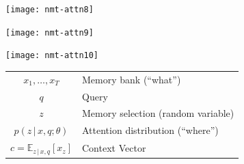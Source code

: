 \documentclass{beamer}
\newcommand{\air}{\vspace{0.25cm}}
\newcommand{\given}{\,|\,}
\begin{document}
\begin{frame}
  \begin{center}
  \end{center}
\center
\vspace{-5mm}
 \air
\texttt{[image: nmt-attn8]}
\end{frame}
\begin{frame}
  \begin{center}
  \end{center}
\center
\vspace{-5mm}
 \air
\texttt{[image: nmt-attn9]}
\end{frame}
\begin{frame}
  \begin{center}
  \end{center}
\center
\vspace{-5mm}
 \air
\texttt{[image: nmt-attn10]}
\end{frame}


\begin{frame}
  \begin{center}

    \air 
    \air 

  \begin{tabular}{cl}
    $x_1, \ldots, x_T $ & Memory bank (``what'') \\
    $q$ &Query \\
    $z$ &Memory selection (random variable)  \\ 
    $p(z \given x, q; \theta)$ & Attention distribution (``where'') \\ 
    $c  =\mathbb{E}_{z \given x, q } [x_z]  $ & Context Vector \\
  \end{tabular}
  \end{center}
\air 



\end{frame}
\end{document}
